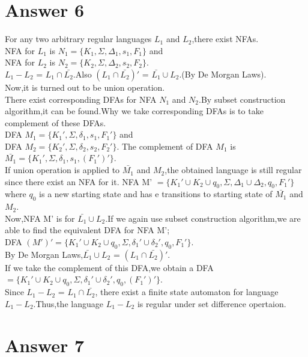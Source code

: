 \documentclass[12pt]{article}
\begin{document}
\section*{Answer 6}
For any two arbitrary regular languages $L_1$ and $L_2$,there exist NFAs.\\
NFA for $L_1$ is $N_1=\{K_1,\Sigma,\Delta_1,s_1,F_1\}$ and \\ NFA for $L_2$ is $N_2=\{K_2,\Sigma,\Delta_2,s_2,F_2\}$.\\
$L_1-L_2$ = $L_1 \cap \bar{L_2}$.Also $(L_1\cap \bar{L_2})'$ = $\bar{L_1} \cup L_2$.(By De Morgan Laws).\\
Now,it is turned out to be union operation.\\
There exist corresponding DFAs for NFA $N_1$ and $N_2$.By subset construction algorithm,it can be found.Why we take corresponding DFAs is to take complement of these DFAs.\\
DFA $M_1=\{K_1',\Sigma,\delta_1,s_1,F_1'\}$ and \\   
DFA $M_2=\{K_2',\Sigma,\delta_2,s_2,F_2'\}$.
The complement of DFA $M_1$ is $\bar{M_1}=\{K_1',\Sigma,\delta_1,s_1,(F_1')'\}$.\\If union operation is applied to $\bar{M_1}$ and $M_2$,the obtained language is still regular since there exist an NFA for it.
NFA M' $=\{K_1' \cup K_2 \cup q_0,\Sigma,\Delta_1 \cup \Delta_2,q_0,F_1'\}$ where $q_0$ is a new starting state and has e transitions to starting state of $\bar{M_1}$ and $M_2$.\\
Now,NFA M' is for $\bar{L_1} \cup L_2$.If we again use subset construction algorithm,we are able to find the equivalent DFA for NFA M';\\
DFA $(M')'= \{K_1' \cup K_2 \cup q_0,\Sigma,\delta_1' \cup \delta_2',q_0,F_1'\}$.\\
By De Morgan Laws,$\bar{L_1} \cup L_2$ = $(L_1\cap \bar{L_2})'$.\\
If we take the complement of this DFA,we obtain a DFA $= \{K_1' \cup K_2 \cup q_0,\Sigma,\delta_1' \cup \delta_2',q_0,(F_1')'\}$.\\ 
Since $L_1-L_2$ = $L_1 \cap \bar{L_2}$, there exist a finite state automaton for language $L_1-L_2$.Thus,the language $L_1-L_2$ is regular under set difference opertaion.

  



\section*{Answer 7}
\end{document}
